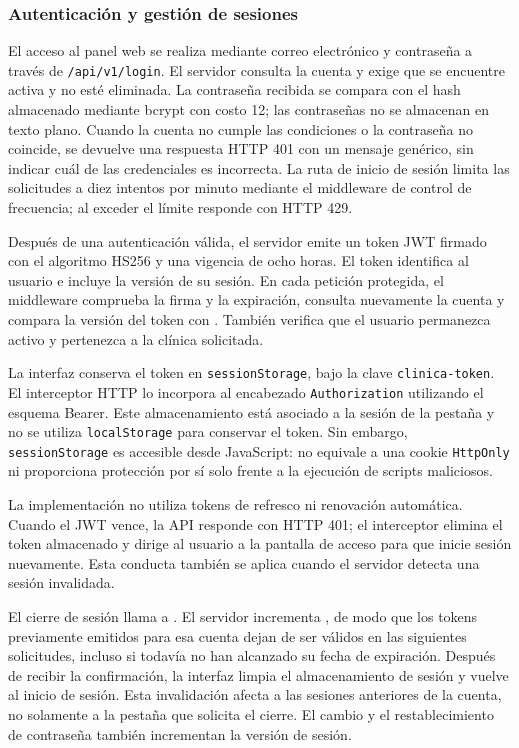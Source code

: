 
\subsubsection{Autenticación y gestión de sesiones}

El acceso al panel web se realiza mediante correo electrónico y contraseña
a través de \texttt{/api/v1/login}. El servidor consulta la cuenta y exige que
se encuentre activa y no esté eliminada. La contraseña recibida se compara
con el hash almacenado mediante bcrypt con costo 12; las contraseñas no se almacenan en
texto plano. Cuando la cuenta no cumple las condiciones o la contraseña no
coincide, se devuelve una respuesta HTTP 401 con un mensaje genérico, sin
indicar cuál de las credenciales es incorrecta. La ruta de inicio de sesión
limita las solicitudes a diez intentos por minuto mediante el middleware
de control de frecuencia; al exceder el límite responde con HTTP 429.

Después de una autenticación válida, el servidor emite un token JWT firmado
con el algoritmo HS256 y una vigencia de ocho horas. El token identifica al
usuario e incluye la versión de su sesión. En cada petición protegida, el
middleware comprueba la firma y la expiración, consulta nuevamente la cuenta
y compara la versión del token con . También verifica
que el usuario permanezca activo y pertenezca a la clínica solicitada.

La interfaz conserva el token en \texttt{sessionStorage}, bajo la clave
\texttt{clinica-token}. El interceptor HTTP lo incorpora al encabezado
\texttt{Authorization} utilizando el esquema Bearer. Este almacenamiento
está asociado a la sesión de la pestaña y no se utiliza
\texttt{localStorage} para conservar el token. Sin embargo,
\texttt{sessionStorage} es accesible desde JavaScript: no equivale a una
cookie \texttt{HttpOnly} ni proporciona protección por sí solo frente a
la ejecución de scripts maliciosos.

La implementación no utiliza tokens de refresco ni renovación automática.
Cuando el JWT vence, la API responde con HTTP 401; el interceptor elimina
el token almacenado y dirige al usuario a la pantalla de acceso para que
inicie sesión nuevamente. Esta conducta también se aplica cuando el
servidor detecta una sesión invalidada.

El cierre de sesión llama a . El servidor incrementa
, de modo que los tokens previamente emitidos para
esa cuenta dejan de ser válidos en las siguientes solicitudes, incluso
si todavía no han alcanzado su fecha de expiración. Después de recibir la
confirmación, la interfaz limpia el almacenamiento de sesión y vuelve al
inicio de sesión. Esta invalidación afecta a las sesiones anteriores de
la cuenta, no solamente a la pestaña que solicita el cierre. El cambio y
el restablecimiento de contraseña también incrementan la versión de sesión.


